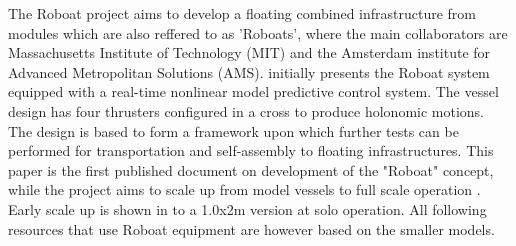 The Roboat project aims to develop a floating combined infrastructure from modules which are also reffered to as 'Roboats', where the main collaborators are Massachusetts Institute of Technology (MIT) and the Amsterdam institute for Advanced Metropolitan Solutions (AMS). \citet{wang2018design} initially presents the Roboat system equipped with a real-time nonlinear model predictive control system. The vessel design has four thrusters configured in a cross to produce holonomic motions. The design is based to form a framework upon which further tests can be performed for transportation and self-assembly to floating infrastructures. This paper is the first published document on development of the "Roboat" concept, while the project  aims to scale up from model vessels to full scale operation \cite{roboatWebsite}. Early scale up is shown in \citet{wang2020roboat} to a 1.0x2m version at solo operation. All following resources that use Roboat equipment are however based on the smaller models. 

\begin{figure}[h!]
	\centering
\end{figure}

